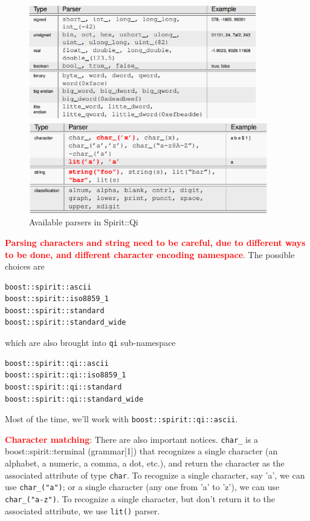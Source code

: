 \begin{figure}[hbt]
  \centerline{\includegraphics[height=5cm,
    angle=0]{./images/Boost_Spirit_parsers.eps}}
  \centerline{\includegraphics[height=4cm,
    angle=0]{./images/Boost_Spirit_parsers_2.eps}}
  \caption{Available parsers in Spirit::Qi}
  \label{fig:Boost_Spirit_parsers}
\end{figure}

\textcolor{red}{\bf Parsing characters and string need to be careful, due to
different ways to be done, and different character encoding namespace}.  The
possible choices are
\begin{verbatim}
boost::spirit::ascii
boost::spirit::iso8859_1
boost::spirit::standard
boost::spirit::standard_wide
\end{verbatim}
which are also brought into \verb!qi! sub-namespace
\begin{verbatim}
boost::spirit::qi::ascii
boost::spirit::qi::iso8859_1
boost::spirit::qi::standard
boost::spirit::qi::standard_wide
\end{verbatim}
Most of the time, we'll work with \verb!boost::spirit::qi::ascii!.

\textcolor{red}{\bf Character matching}: There are also important notices.
\verb!char_! is a boost::spirit::terminal (grammar[1]) that recognizes a single
character (an alphabet, a numeric, a comma, a dot, etc.), and return the
character as the associated attribute of type \verb!char!. To recognize a single
character, say 'a', we can use \verb!char_("a")!; or a single character (any
one from 'a' to 'z'), we can use \verb!char_("a-z")!. To recognize a single
character, but don't return it to the associated attribute, we use \verb!lit()!
parser.

